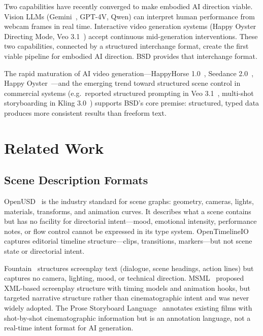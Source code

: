 \documentclass{article}
\begin{document}
Two capabilities have recently converged to make embodied AI direction viable. Vision LLMs (Gemini~\cite{gemini2024}, GPT-4V, Qwen) can interpret human performance from webcam frames in real time. Interactive video generation systems (Happy Oyster~\cite{happyoyster2026} Directing Mode, Veo 3.1~\cite{veo31_2025}) accept continuous mid-generation interventions. These two capabilities, connected by a structured interchange format, create the first viable pipeline for embodied AI direction. BSD provides that interchange format.

The rapid maturation of AI video generation---HappyHorse 1.0~\cite{happyhorse2026}, Seedance 2.0~\cite{seedance2026}, Happy Oyster~\cite{happyoyster2026}---and the emerging trend toward structured scene control in commercial systems (e.g.\ reported structured prompting in Veo 3.1~\cite{veo31_2025}, multi-shot storyboarding in Kling 3.0~\cite{kling30_2025}) supports BSD's core premise: structured, typed data produces more consistent results than freeform text.

\section{Related Work}\label{sec:related}

\subsection{Scene Description Formats}

OpenUSD~\cite{openusd2016} is the industry standard for scene graphs: geometry, cameras, lights, materials, transforms, and animation curves. It describes what a scene contains but has no facility for directorial intent---mood, emotional intensity, performance notes, or flow control cannot be expressed in its type system. OpenTimelineIO~\cite{otio2018} captures editorial timeline structure---clips, transitions, markers---but not scene state or directorial intent.

Fountain~\cite{fountain2012} structures screenplay text (dialogue, scene headings, action lines) but captures no camera, lighting, mood, or technical direction. MSML~\cite{msml2009} proposed XML-based screenplay structure with timing models and animation hooks, but targeted narrative structure rather than cinematographic intent and was never widely adopted. The Prose Storyboard Language~\cite{psl2015} annotates existing films with shot-by-shot cinematographic information but is an annotation language, not a real-time intent format for AI generation.
\end{document}
